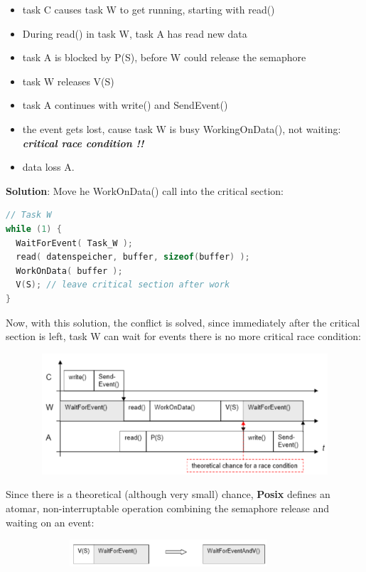 \begin{itemize}
	\item task C causes task W to get running, starting with read()
	\item During read() in task W, task A has read new data
	\item task A is blocked by P(S), before W could release the semaphore
	\item task W releases V(S)
	\item task A continues with write() and SendEvent()
	\item the event gets lost, cause task W is busy WorkingOnData(), not waiting:  \textbf{\textit{critical race condition !!}}
	\item data loss A.
\end{itemize}
  
\textbf{Solution}: Move he WorkOnData() call into the critical section:

\begin{lstlisting}[style=mystyle, language=c]
// Task W
while (1) {
  WaitForEvent( Task_W );
  read( datenspeicher, buffer, sizeof(buffer) );
  WorkOnData( buffer );
  V(S); // leave critical section after work
}
\end{lstlisting}

Now, with this solution, the conflict is solved, since immediately after the critical section is left, task W can wait for events there is no more critical race condition:

 	\begin{figure}[h]
    \centering
    \includegraphics[width=14cm, height=4.5cm]{Images/image113.png}
    \label{fig:Fig 60}
    \end{figure}

Since there is a theoretical (although very small) chance, \textbf{Posix} defines an atomar, non-interruptable operation combining the semaphore release and waiting on an event:

 	\begin{figure}[h]
    \centering
    \includegraphics[width=10cm, height=1cm]{Images/image114.png}
    \label{fig:Fig 61}
    \end{figure}
    
